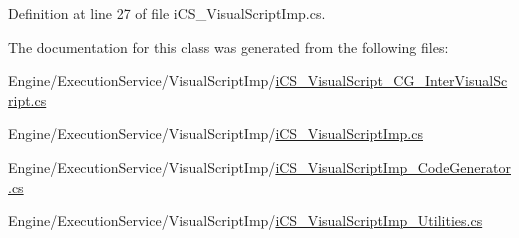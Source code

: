 Definition at line 27 of file i\+C\+S\+\_\+\+Visual\+Script\+Imp.\+cs.



The documentation for this class was generated from the following files\+:\begin{DoxyCompactItemize}
\item 
Engine/\+Execution\+Service/\+Visual\+Script\+Imp/\hyperlink{i_c_s___visual_script___c_g___inter_visual_script_8cs}{i\+C\+S\+\_\+\+Visual\+Script\+\_\+\+C\+G\+\_\+\+Inter\+Visual\+Script.\+cs}\item 
Engine/\+Execution\+Service/\+Visual\+Script\+Imp/\hyperlink{i_c_s___visual_script_imp_8cs}{i\+C\+S\+\_\+\+Visual\+Script\+Imp.\+cs}\item 
Engine/\+Execution\+Service/\+Visual\+Script\+Imp/\hyperlink{i_c_s___visual_script_imp___code_generator_8cs}{i\+C\+S\+\_\+\+Visual\+Script\+Imp\+\_\+\+Code\+Generator.\+cs}\item 
Engine/\+Execution\+Service/\+Visual\+Script\+Imp/\hyperlink{i_c_s___visual_script_imp___utilities_8cs}{i\+C\+S\+\_\+\+Visual\+Script\+Imp\+\_\+\+Utilities.\+cs}\end{DoxyCompactItemize}
